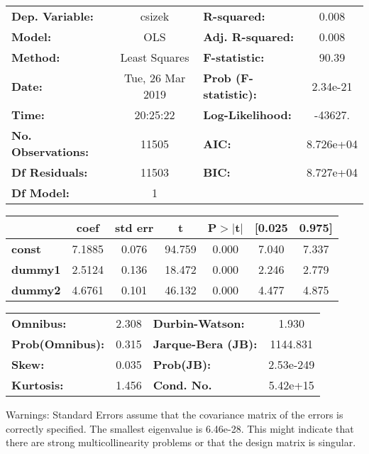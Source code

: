\begin{center}
\begin{tabular}{lclc}
\toprule
\textbf{Dep. Variable:}    &      csizek      & \textbf{  R-squared:         } &     0.008   \\
\textbf{Model:}            &       OLS        & \textbf{  Adj. R-squared:    } &     0.008   \\
\textbf{Method:}           &  Least Squares   & \textbf{  F-statistic:       } &     90.39   \\
\textbf{Date:}             & Tue, 26 Mar 2019 & \textbf{  Prob (F-statistic):} &  2.34e-21   \\
\textbf{Time:}             &     20:25:22     & \textbf{  Log-Likelihood:    } &   -43627.   \\
\textbf{No. Observations:} &       11505      & \textbf{  AIC:               } & 8.726e+04   \\
\textbf{Df Residuals:}     &       11503      & \textbf{  BIC:               } & 8.727e+04   \\
\textbf{Df Model:}         &           1      & \textbf{                     } &             \\
\bottomrule
\end{tabular}
\begin{tabular}{lcccccc}
                & \textbf{coef} & \textbf{std err} & \textbf{t} & \textbf{P$>$$|$t$|$} & \textbf{[0.025} & \textbf{0.975]}  \\
\midrule
\textbf{const}  &       7.1885  &        0.076     &    94.759  &         0.000        &        7.040    &        7.337     \\
\textbf{dummy1} &       2.5124  &        0.136     &    18.472  &         0.000        &        2.246    &        2.779     \\
\textbf{dummy2} &       4.6761  &        0.101     &    46.132  &         0.000        &        4.477    &        4.875     \\
\bottomrule
\end{tabular}
\begin{tabular}{lclc}
\textbf{Omnibus:}       &  2.308 & \textbf{  Durbin-Watson:     } &     1.930  \\
\textbf{Prob(Omnibus):} &  0.315 & \textbf{  Jarque-Bera (JB):  } &  1144.831  \\
\textbf{Skew:}          &  0.035 & \textbf{  Prob(JB):          } & 2.53e-249  \\
\textbf{Kurtosis:}      &  1.456 & \textbf{  Cond. No.          } &  5.42e+15  \\
\bottomrule
\end{tabular}
\end{center}

Warnings: \newline
 [1] Standard Errors assume that the covariance matrix of the errors is correctly specified. \newline
 [2] The smallest eigenvalue is 6.46e-28. This might indicate that there are \newline
 strong multicollinearity problems or that the design matrix is singular.